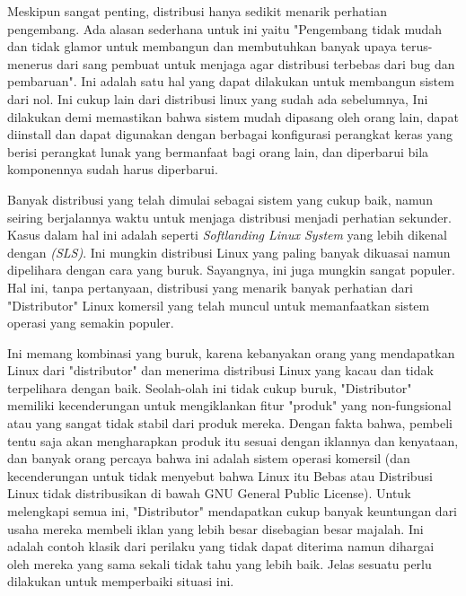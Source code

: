 \noindent
Meskipun sangat penting, distribusi hanya sedikit menarik perhatian pengembang. Ada alasan sederhana untuk ini yaitu "Pengembang tidak mudah dan tidak glamor untuk membangun dan membutuhkan banyak upaya terus-menerus dari sang pembuat untuk menjaga agar distribusi terbebas dari bug dan pembaruan". Ini adalah satu hal yang dapat dilakukan untuk membangun sistem dari nol. Ini cukup lain dari distribusi linux yang sudah ada sebelumnya, Ini dilakukan demi memastikan bahwa sistem mudah dipasang oleh orang lain, dapat diinstall dan dapat digunakan dengan berbagai konfigurasi perangkat keras yang berisi perangkat lunak yang bermanfaat bagi orang lain, dan diperbarui bila komponennya sudah harus diperbarui.

\noindent
Banyak distribusi yang telah dimulai sebagai sistem yang cukup baik, namun seiring berjalannya waktu untuk menjaga distribusi menjadi perhatian sekunder. Kasus dalam hal ini adalah seperti \textit{Softlanding Linux System} yang lebih dikenal dengan \textit{(SLS)}. Ini mungkin distribusi Linux yang paling banyak dikuasai namun dipelihara dengan cara yang buruk. Sayangnya, ini juga mungkin sangat populer. Hal ini, tanpa pertanyaan, distribusi yang menarik banyak perhatian dari "Distributor" Linux komersil yang telah muncul untuk memanfaatkan sistem operasi yang semakin populer.

\noindent
Ini memang kombinasi yang buruk, karena kebanyakan orang yang mendapatkan Linux dari "distributor" dan menerima distribusi Linux yang kacau dan tidak terpelihara dengan baik. Seolah-olah ini tidak cukup buruk, "Distributor" memiliki kecenderungan untuk mengiklankan fitur "produk" yang non-fungsional atau yang sangat tidak stabil dari produk mereka. Dengan fakta bahwa, pembeli tentu saja akan mengharapkan produk itu sesuai dengan iklannya dan kenyataan, dan banyak orang percaya bahwa ini adalah sistem operasi komersil (dan kecenderungan untuk tidak menyebut bahwa Linux itu Bebas atau Distribusi Linux tidak distribusikan di bawah GNU General Public License). Untuk melengkapi semua ini, "Distributor" mendapatkan cukup banyak keuntungan dari usaha mereka membeli iklan yang lebih besar disebagian besar majalah. Ini adalah contoh klasik dari perilaku yang tidak dapat diterima namun dihargai oleh mereka yang sama sekali tidak tahu yang lebih baik. Jelas sesuatu perlu dilakukan untuk memperbaiki situasi ini.


